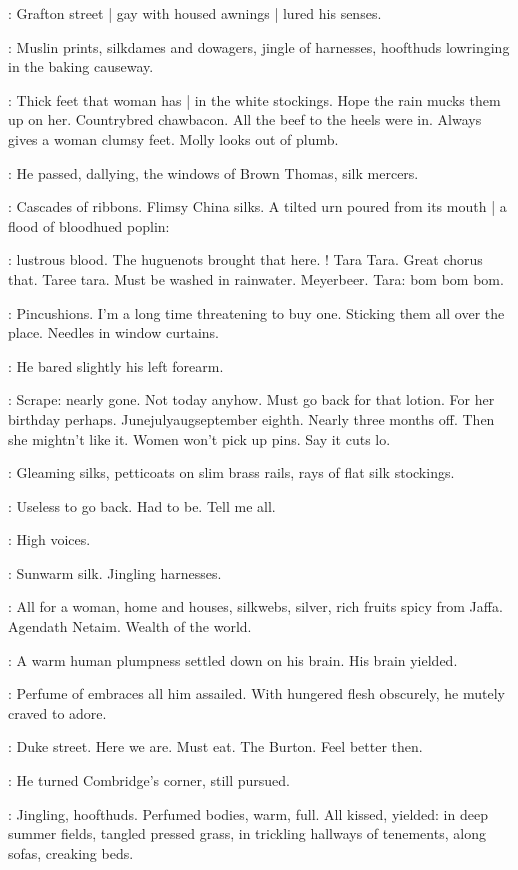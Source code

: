 :
Grafton street |
gay with housed awnings |
lured his senses.

:
Muslin prints, silkdames and dowagers,
jingle of harnesses,
hoofthuds lowringing in the baking causeway.

\BloomInt:
Thick feet that woman has |
in the white stockings.
Hope the rain mucks them up on her.
Countrybred chawbacon.
All the beef to the heels were in.
Always gives a woman clumsy feet.
Molly looks out of plumb.

:
He passed, dallying,
the windows of Brown Thomas, silk mercers.

:
Cascades of ribbons.
Flimsy China silks.
A tilted urn poured from its mouth |
a flood of bloodhued poplin:

\BloomInt:
lustrous blood.
The huguenots brought that here.
!
Tara Tara.
Great chorus that.
Taree tara.
Must be washed in rainwater.
Meyerbeer.
Tara:
bom bom bom.

\BloomInt:
Pincushions.
I'm a long time threatening to buy one.
Sticking them all over the place.
Needles in window curtains.

:
He bared slightly his left forearm.

\BloomInt:
Scrape: nearly gone.
Not today anyhow.
Must go back for that lotion.
For her birthday perhaps.
Junejulyaugseptember eighth.
Nearly three months off.
Then she mightn't like it.
Women won't pick up pins.
Say it cuts lo.

:
Gleaming silks,
petticoats on slim brass rails,
rays of flat silk stockings.

\BloomInt:
Useless to go back.
Had to be.
Tell me all.

\BloomInt:
High voices.

:
Sunwarm silk.
Jingling harnesses.

\BloomInt:
All for a woman,
home and houses,
silkwebs, silver,
rich fruits spicy from Jaffa.
Agendath Netaim.
Wealth of the world.

:
A warm human plumpness settled down on his brain.
His brain yielded.

:
Perfume of embraces all him assailed.
With hungered flesh obscurely,
he mutely craved to adore.

\BloomInt:
Duke street.
Here we are.
Must eat.
The Burton.
Feel better then.

:
He turned Combridge's corner, still pursued.

:
Jingling, hoofthuds.
Perfumed bodies, warm, full.
All kissed, yielded:
in deep summer fields,
tangled pressed grass,
in trickling hallways of tenements,
along sofas, creaking beds.

